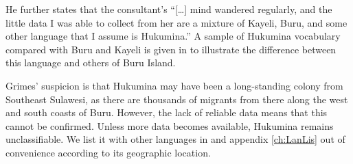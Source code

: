 He further states that the consultant's ``[\ldots] mind wandered
regularly, and the little data I was able to collect from her are a mixture of Kayeli,
Buru, and some other language that I assume is Hukumina.'' \citep[75]{Grimes2010}
A sample of Hukumina vocabulary compared with Buru and Kayeli is given in 
to illustrate the difference between this language and others of Buru Island.

Grimes' suspicion is that Hukumina may have been a long-standing colony from
Southeast Sulawesi, as there are thousands of migrants from there along the
west and south coasts of Buru. However, the lack of reliable data means
that this cannot be confirmed. Unless more data becomes available,
Hukumina remains unclassifiable. We list it with other  languages
in  and appendix \ref{ch:LanLis} out of convenience according to its geographic location.
